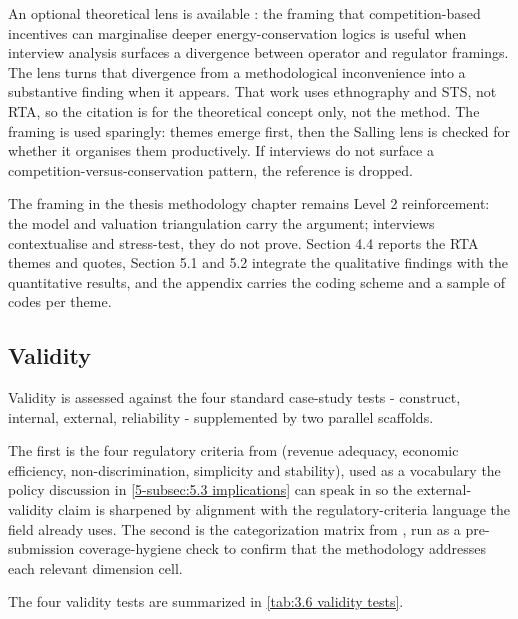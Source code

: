 An optional theoretical lens is available \cite{salling_incentives_2024}: the framing that competition-based incentives can marginalise deeper energy-conservation logics is useful when interview analysis surfaces a divergence between operator and regulator framings. The lens turns that divergence from a methodological inconvenience into a substantive finding when it appears. That work uses ethnography and STS, not RTA, so the citation is for the theoretical concept only, not the method. The framing is used sparingly: themes emerge first, then the Salling lens is checked for whether it organises them productively. If interviews do not surface a competition-versus-conservation pattern, the reference is dropped.

The framing in the thesis methodology chapter remains Level 2 reinforcement: the model and valuation triangulation carry the argument; interviews contextualise and stress-test, they do not prove. Section 4.4 reports the RTA themes and quotes, Section 5.1 and 5.2 integrate the qualitative findings with the quantitative results, and the appendix carries the coding scheme and a sample of codes per theme.



\subsection{Validity}
\label{3-subsec:3.6}

Validity is assessed against the four standard case-study tests - construct, internal, external, reliability - supplemented by two parallel scaffolds.

The first is the four regulatory criteria from \cite{bergaentzle_electricity_2019} (revenue adequacy, economic efficiency, non-discrimination, simplicity and stability), used as a vocabulary the policy discussion in \autoref{5-subsec:5.3 implications} can speak in so the external-validity claim is sharpened by alignment with the regulatory-criteria language the field already uses. The second is the categorization matrix from \cite{atabaki_systematic_2025}, run as a pre-submission coverage-hygiene check to confirm that the methodology addresses each relevant dimension cell.

The four validity tests are summarized in \autoref{tab:3.6 validity tests}.

